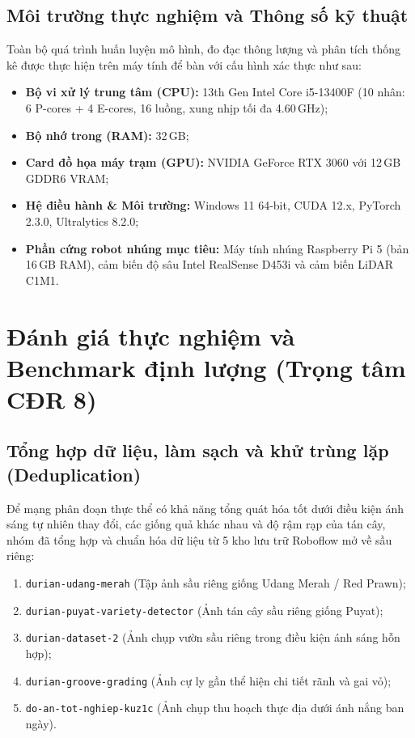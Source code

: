 \documentclass[12pt,a4paper]{article}
\begin{document}
\subsection{Môi trường thực nghiệm và Thông số kỹ thuật}
Toàn bộ quá trình huấn luyện mô hình, đo đạc thông lượng và phân tích thống kê được thực hiện trên máy tính để bàn với cấu hình xác thực như sau:
\begin{itemize}
    \item \textbf{Bộ vi xử lý trung tâm (CPU):} 13th Gen Intel Core i5-13400F (10 nhân: 6 P-cores + 4 E-cores, 16 luồng, xung nhịp tối đa 4.60\,GHz);
    \item \textbf{Bộ nhớ trong (RAM):} 32\,GB;
    \item \textbf{Card đồ họa máy trạm (GPU):} NVIDIA GeForce RTX 3060 với 12\,GB GDDR6 VRAM;
    \item \textbf{Hệ điều hành \& Môi trường:} Windows 11 64-bit, CUDA 12.x, PyTorch 2.3.0, Ultralytics 8.2.0;
    \item \textbf{Phần cứng robot nhúng mục tiêu:} Máy tính nhúng Raspberry Pi 5 (bản 16\,GB RAM), cảm biến độ sâu Intel RealSense D453i và cảm biến LiDAR C1M1.
\end{itemize}

\section{Đánh giá thực nghiệm và Benchmark định lượng (Trọng tâm CĐR 8)}

\subsection{Tổng hợp dữ liệu, làm sạch và khử trùng lặp (Deduplication)}
Để mạng phân đoạn thực thể có khả năng tổng quát hóa tốt dưới điều kiện ánh sáng tự nhiên thay đổi, các giống quả khác nhau và độ rậm rạp của tán cây, nhóm đã tổng hợp và chuẩn hóa dữ liệu từ 5 kho lưu trữ Roboflow mở về sầu riêng:
\begin{enumerate}
    \item \texttt{durian-udang-merah} (Tập ảnh sầu riêng giống Udang Merah / Red Prawn);
    \item \texttt{durian-puyat-variety-detector} (Ảnh tán cây sầu riêng giống Puyat);
    \item \texttt{durian-dataset-2} (Ảnh chụp vườn sầu riêng trong điều kiện ánh sáng hỗn hợp);
    \item \texttt{durian-groove-grading} (Ảnh cự ly gần thể hiện chi tiết rãnh và gai vỏ);
    \item \texttt{do-an-tot-nghiep-kuz1c} (Ảnh chụp thu hoạch thực địa dưới ánh nắng ban ngày).
\end{enumerate}
\end{document}
